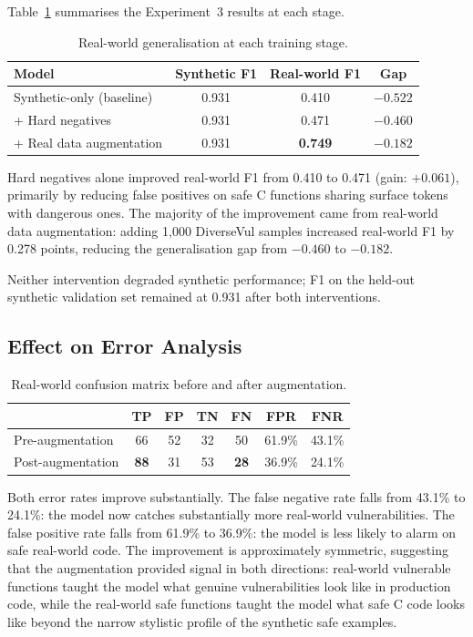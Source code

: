 Table~\ref{tab:augmentation_effect} summarises the Experiment~3 results at each stage.

\begin{table}[H]
  \centering
  \caption{Real-world generalisation at each training stage.}
  \label{tab:augmentation_effect}
  \begin{tabular}{lccc}
    \toprule
    Model & Synthetic F1 & Real-world F1 & Gap \\
    \midrule
    Synthetic-only (baseline) & 0.931 & 0.410 & $-0.522$ \\
    + Hard negatives          & 0.931 & 0.471 & $-0.460$ \\
    + Real data augmentation  & 0.931 & \textbf{0.749} & $\mathbf{-0.182}$ \\
    \bottomrule
  \end{tabular}
\end{table}

Hard negatives alone improved real-world F1 from 0.410 to 0.471 (gain: $+0.061$),
primarily by reducing false positives on safe C functions sharing surface tokens with
dangerous ones.
The majority of the improvement came from real-world data augmentation: adding 1{,}000
DiverseVul samples increased real-world F1 by 0.278 points, reducing the generalisation
gap from $-0.460$ to $-0.182$.

Neither intervention degraded synthetic performance; F1 on the held-out synthetic
validation set remained at 0.931 after both interventions.

\subsection{Effect on Error Analysis}

\begin{table}[H]
  \centering
  \caption{Real-world confusion matrix before and after augmentation.}
  \label{tab:cm_before_after}
  \begin{tabular}{lcccccc}
    \toprule
    & TP & FP & TN & FN & FPR & FNR \\
    \midrule
    Pre-augmentation  & 66 & 52 & 32 & 50 & 61.9\% & 43.1\% \\
    Post-augmentation & \textbf{88} & 31 & 53 & \textbf{28} & 36.9\% & 24.1\% \\
    \bottomrule
  \end{tabular}
\end{table}

Both error rates improve substantially.
The false negative rate falls from 43.1\% to 24.1\%: the model now catches substantially
more real-world vulnerabilities.
The false positive rate falls from 61.9\% to 36.9\%: the model is less likely to alarm
on safe real-world code.
The improvement is approximately symmetric, suggesting that the augmentation provided
signal in both directions: real-world vulnerable functions taught the model what genuine
vulnerabilities look like in production code, while the real-world safe functions taught
the model what safe C code looks like beyond the narrow stylistic profile of the synthetic
safe examples.

